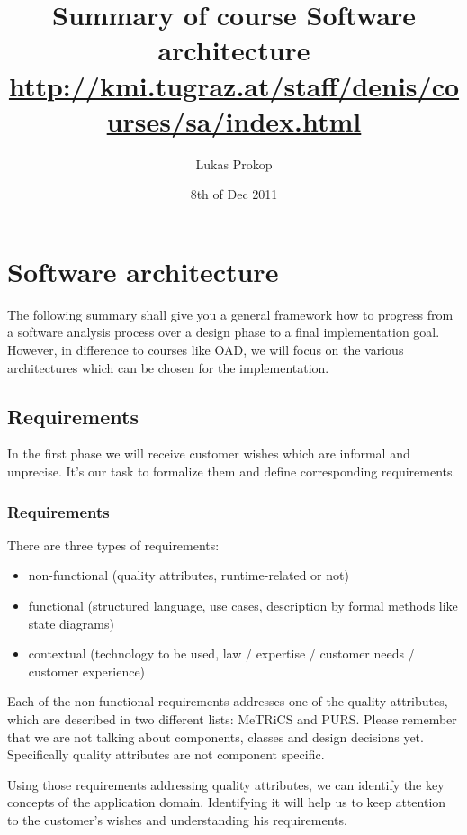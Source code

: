 \documentclass[a4paper]{report}
\title{
    Summary of course Software architecture \\
    \small{\url{http://kmi.tugraz.at/staff/denis/courses/sa/index.html}}
}
\author{Lukas Prokop}
\date{8th of Dec 2011}
\begin{document}
\maketitle
\tableofcontents

\chapter{Software architecture}

The following summary shall give you a general framework how to progress
from a software analysis process over a design phase to a final
implementation goal. However, in difference to courses like OAD, we will
focus on the various architectures which can be chosen for the
implementation.

\section{Requirements}

In the first phase we will receive customer wishes which are informal and
unprecise. It's our task to formalize them and define corresponding
requirements.

\subsection{Requirements}

There are three types of requirements:

\begin{itemize}
  \item non-functional (quality attributes, runtime-related or not)
  \item functional (structured language, use cases, description by
            formal methods like state diagrams)
  \item contextual (technology to be used, law / expertise / customer needs
            / customer experience)
\end{itemize}

Each of the non-functional requirements addresses one of the quality
attributes, which are described in two different lists: MeTRiCS and
PURS. Please remember that we are not talking about components, classes
and design decisions yet. Specifically quality attributes are not component
specific.

Using those requirements addressing quality attributes, we can identify
the key concepts of the application domain. Identifying it will help us
to keep attention to the customer's wishes and understanding his
requirements.
\end{document}

